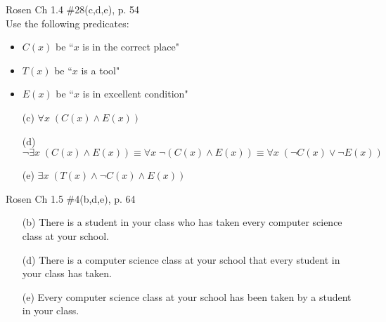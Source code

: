 \documentclass[12pt,addpoints]{exam}
\newcommand{\ra}{\rightarrow}
\begin{document}
\begin{questions}
\question Rosen Ch 1.4 \#28(c,d,e), p. 54 \\
Use the following predicates:
\begin{itemize}[itemsep=0pt,parsep=0pt,topsep=0pt,partopsep=0pt]
    \item $C(x)$ be ``$x$ is in the correct place"
    \item $T(x)$ be ``$x$ is a tool"
    \item $E(x)$ be ``$x$ is in excellent condition"
\end{itemize}
    \ifprintanswers
        \vspace{-12pt}
    \fi
\begin{solution}
    \begin{itemize}[itemsep=0pt,parsep=0pt,topsep=0pt,partopsep=0pt]
        \item[(c)] $\forall x\; (C(x) \wedge E(x)) $
        \item[(d)] $\neg \exists x\; (C(x) \wedge E(x)) \equiv \forall x\; \neg (C(x) \wedge E(x)) \equiv \forall x\; (\neg C(x) \vee \neg E(x))$
        \item[(e)] $\exists x\; (T(x) \wedge \neg C(x) \wedge E(x))$
    \end{itemize}
\end{solution}


\question Rosen Ch 1.5 \#4(b,d,e), p. 64
    \ifprintanswers
        \vspace{-12pt}
    \fi
\begin{solution}
    \begin{itemize}[itemsep=0pt,parsep=0pt,topsep=0pt,partopsep=0pt]
       \item[(b)] There is a student in your class who has taken every computer science class at your school.
        \item[(d)] There is a computer science class at your school that every student in your class has taken.
        \item[(e)] Every computer science class at your school has been taken by a student in your class.
    \end{itemize}
\end{solution}



\end{questions}
\end{document}
